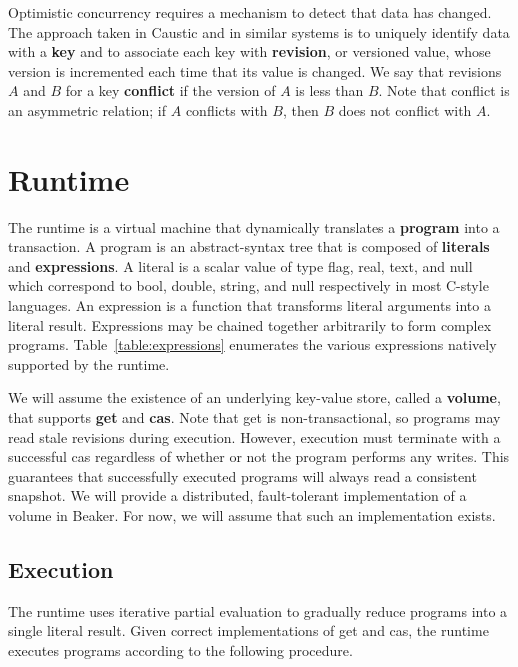 \documentclass[../main.tex]{subfiles}
\begin{document}
  Optimistic concurrency requires a mechanism to detect that data has changed. The approach taken in
  Caustic and in similar systems is to uniquely identify data with a \textbf{key} and to associate
  each key with \textbf{revision}, or versioned value, whose version is incremented each time that
  its value is changed. We say that revisions $A$ and $B$ for a key \textbf{conflict} if the version
  of $A$ is less than $B$. Note that conflict is an asymmetric relation; if $A$ conflicts with $B$,
  then $B$ does not conflict with $A$.

\section{Runtime}
The runtime is a virtual machine that dynamically translates a \textbf{program} into a transaction.
A program is an abstract-syntax tree that is composed of \textbf{literals} and \textbf{expressions}.
A literal is a scalar value of type flag, real, text, and null which correspond to bool, double,
string, and null respectively in most C-style languages. An expression is a function that transforms
literal arguments into a literal result. Expressions may be chained together arbitrarily to form
complex programs. Table~\ref{table:expressions} enumerates the various expressions natively
supported by the runtime.

We will assume the existence of an underlying key-value store, called a \textbf{volume}, that
supports \textbf{get} and \textbf{cas}. Note that get is non-transactional, so programs may read
stale revisions during execution. However, execution must terminate with a successful cas regardless
of whether or not the program performs any writes. This guarantees that successfully executed
programs will always read a consistent snapshot. We will provide a distributed, fault-tolerant
implementation of a volume in Beaker. For now, we will assume that such an implementation exists.

  \subsection{Execution}
  The runtime uses iterative partial evaluation to gradually reduce programs into a single literal
  result. Given correct implementations of get and cas, the runtime executes programs according to
  the following procedure.
\end{document}
